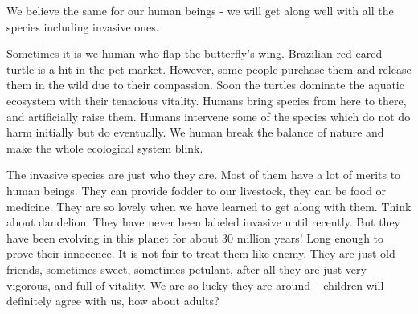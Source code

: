 \documentclass[12pt]{article}
\begin{document}
We believe the same for our human beings - we will get along well with all the species including invasive ones.

Sometimes it is we human who flap the butterfly's wing.  Brazilian red eared turtle is a hit in the pet market. However, some people purchase them and release them in the wild due to their compassion. Soon the turtles dominate the aquatic ecosystem with their tenacious vitality.  Humans bring species from here to there, and artificially raise them.  Humans intervene some of the species which do not do harm initially but do eventually.  We human break the balance of nature and make the whole ecological system blink.

The invasive species are just who they are.  Most of them have a lot of merits to human beings.  They can provide fodder to our livestock, they can be food or medicine.  They are so lovely when we have learned to get along with them.  Think about dandelion.  They have never been labeled invasive until recently.  But they have been evolving in this planet for about 30 million years! Long enough to prove their innocence.  It is not fair to treat them like enemy.  They are just old friends, sometimes sweet, sometimes petulant, after all they are just very vigorous, and full of vitality.  We are so lucky they are around -- children will definitely agree with us, how about adults?

\newpage

\begin{spacing}{0.9}
{}
\newrefcontext
\printbibliography
\end{spacing}
	
\end{document}
